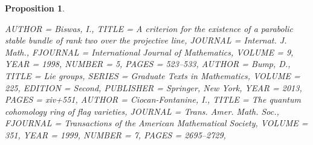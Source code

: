 \documentclass[11pt]{amsart}
\newtheorem{proposition}[theorem]{Proposition}
\numberwithin{theorem}{subsection}
\begin{document}
{\begin{proposition}
\begin{bibdiv}
\begin{biblist}
 {
    AUTHOR = {Biswas, I.},
     TITLE = {A criterion for the existence of a parabolic stable bundle of
              rank two over the projective line},
   JOURNAL = {Internat. J. Math.},
  FJOURNAL = {International Journal of Mathematics},
    VOLUME = {9},
      YEAR = {1998},
    NUMBER = {5},
     PAGES = {523--533},
}
 {
    AUTHOR = {Bump, D.},
     TITLE = {Lie groups},
    SERIES = {Graduate Texts in Mathematics},
    VOLUME = {225},
   EDITION = {Second},
 PUBLISHER = {Springer, New York},
      YEAR = {2013},
     PAGES = {xiv+551},
}
 {
    AUTHOR = {Ciocan-Fontanine, I.},
     TITLE = {The quantum cohomology ring of flag varieties},
   JOURNAL = {Trans. Amer. Math. Soc.},
  FJOURNAL = {Transactions of the American Mathematical Society},
    VOLUME = {351},
      YEAR = {1999},
    NUMBER = {7},
     PAGES = {2695--2729},
}
\iffalse
{}
\end{biblist}
\end{bibdiv}
\end{proposition}}
\end{document}
